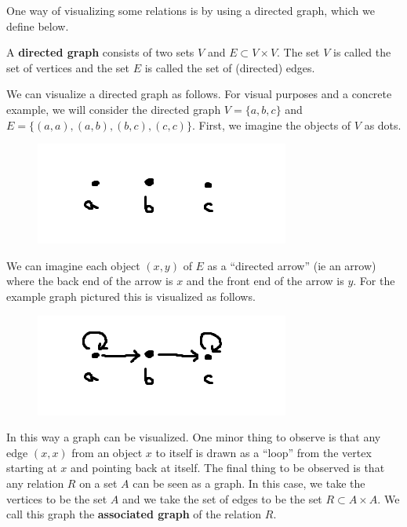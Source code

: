 One way of visualizing some relations is by using a directed graph, which we define below.

\begin{definition}
A \textbf{directed graph} consists of two sets $V$ and $E \subset V \times V$. The set $V$ is called the set of vertices and the set $E$ is called the set of (directed) edges. 
\end{definition}

We can visualize a directed graph as follows. For visual purposes and a concrete example, we will consider the directed graph $V = \{a, b, c\}$ and $E = \{(a, a), (a, b), (b, c), (c, c)\}$. First, we imagine the objects of $V$ as dots.

\begin{figure}[ht]
	\centering
	\includegraphics{Ch3/vertices.png}
\end{figure}

We can imagine each object $(x, y)$ of $E$ as a ``directed arrow'' (ie an arrow) where the back end of the arrow is $x$ and the front end of the arrow is $y$. For the example graph pictured this is visualized as follows.

\begin{figure}[ht]
	\centering
	\includegraphics{Ch3/edges.png}
\end{figure}

In this way a graph can be visualized. One minor thing to observe is that any edge $(x, x)$ from an object $x$ to itself is drawn as a ``loop'' from the vertex starting at $x$ and pointing back at itself. The final thing to be observed is that any relation $R$ on a set $A$ can be seen as a graph. In this case, we take the vertices to be the set $A$ and we take the set of edges to be the set $R \subset A \times A$. We call this graph the \textbf{associated graph} of the relation $R$.

